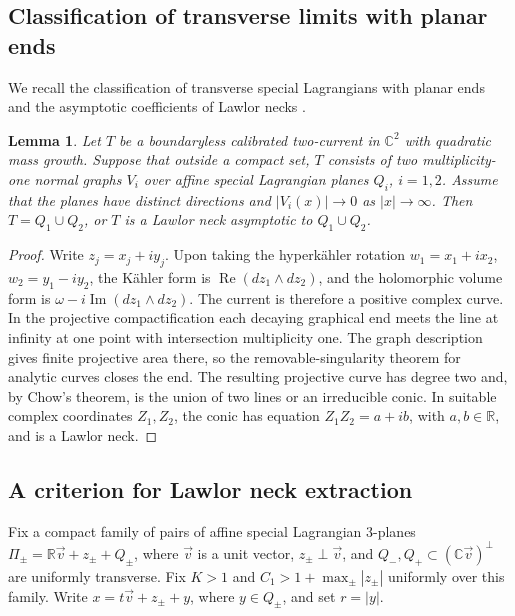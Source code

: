 \documentclass[11pt,a4paper]{article}
\numberwithin{equation}{section}
\newtheorem{lemma}[theorem]{Lemma}
\theoremstyle{definition}
\theoremstyle{remark}
\newcommand{\R}{\mathbb R}
\newcommand{\C}{\mathbb C}
\newcommand{\Ree}{\operatorname{Re}}
\begin{document}
	\subsection{Classification of transverse limits with planar ends}
	
	We recall the classification of transverse special Lagrangians with
	planar ends and the asymptotic coefficients of Lawlor necks
	\cite{Lawlor,LSSz}.
	
	\begin{lemma}\label{lem:lawlor-classification}
		Let $T$ be a boundaryless calibrated two-current in $\C^2$ with quadratic
		mass growth. Suppose that outside a compact set, $T$ consists of
		two multiplicity-one normal graphs $V_i$ over affine special
		Lagrangian planes $Q_i$, $i=1,2$. Assume that the planes have distinct
		directions and $|V_i(x)|\to0$ as $|x|\to\infty$. Then
		$T=Q_1\cup Q_2$, or $T$ is a Lawlor neck asymptotic to
		$Q_1\cup Q_2$.
	\end{lemma}
	
	\begin{proof}
		Write $z_j=x_j+iy_j$. Upon taking the hyperk\"ahler rotation
		$w_1=x_1+ix_2$, $w_2=y_1-iy_2$, the K\"ahler form is
		$\Ree(dz_1\wedge dz_2)$, and the holomorphic volume form is
		$\omega-i\operatorname{Im}(dz_1\wedge dz_2)$.
		The current is therefore a positive complex curve.
		In the projective compactification each decaying graphical end meets
		the line at infinity at one point with intersection multiplicity one.
		The graph description gives finite projective area there, so the
		removable-singularity theorem for analytic curves closes the end.
		The resulting projective curve has degree two and, by Chow's theorem,
		is the union of two lines or an irreducible conic. In suitable complex
		coordinates $Z_1,Z_2$, the conic has equation $Z_1Z_2=a+ib$, with $a,b\in\R$,
		and is a Lawlor neck.
	\end{proof}
	
	\subsection{A criterion for Lawlor neck extraction}
	
	Fix a compact family of pairs of affine special Lagrangian $3$-planes
	$\Pi_\pm=\mathbb R\vec v+z_\pm+Q_\pm$, where $\vec v$ is a unit vector,
	$z_\pm\perp\vec v$, and $Q_-,Q_+\subset(\mathbb C\vec v)^\perp$ are
	uniformly transverse. Fix $K>1$ and
	$C_1>1+\max_\pm|z_\pm|$ uniformly over this family.
	Write $x=t\vec v+z_\pm+y$, where $y\in Q_\pm$, and set $r=|y|$.
	
\end{document}
